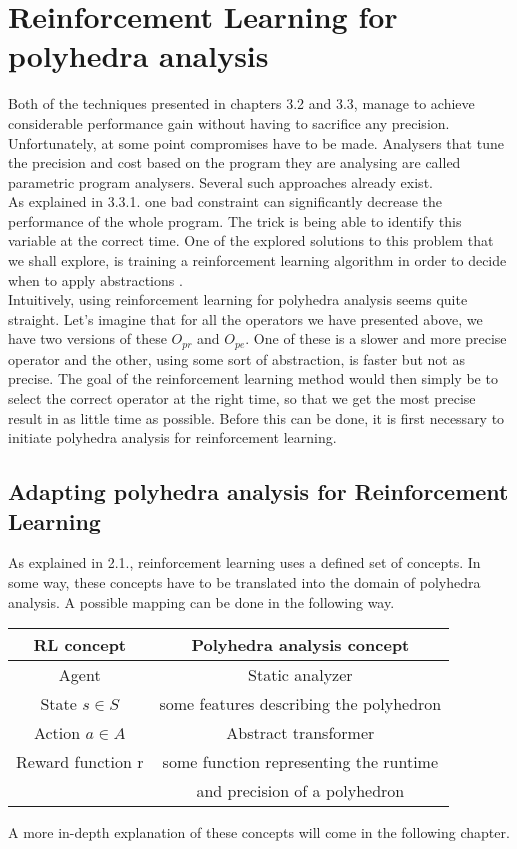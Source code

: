 \section{Reinforcement Learning for polyhedra analysis}
Both of the techniques presented in chapters 3.2 and 3.3, manage to achieve considerable performance gain without having to sacrifice any precision. Unfortunately, at some point compromises have to be made. Analysers that tune the precision and cost based on the program they are analysing are called parametric program analysers. Several such approaches already exist. \cite{oh2015learning,liang2011learning,heo2016learning} \\
As explained in 3.3.1. one bad constraint can significantly decrease the performance of the whole program. The trick is being able to identify this variable at the correct time. One of the explored solutions to this problem that we shall explore, is training a reinforcement learning algorithm  in order to decide when to apply abstractions \cite{singh2018fast}.\\
Intuitively, using reinforcement learning for polyhedra analysis seems quite straight. Let's imagine that for all the operators we have presented above, we have two versions of these $O_{pr}$ and $O_{pe}$. One of these is a slower and more precise operator and the other, using some sort of abstraction, is faster but not as precise. The goal of the reinforcement learning method would then simply be to select the correct operator at the right time, so that we get the most precise result in as little time as possible. Before this can be done, it is first necessary to initiate polyhedra analysis for reinforcement learning.

\subsection{Adapting polyhedra analysis for Reinforcement Learning}
As explained in 2.1., reinforcement learning uses a defined set of concepts. In some way, these concepts have to be translated into the domain of polyhedra analysis. A possible mapping can be done in the following way.
\begin{center}
\begin{tabular}{||c c||} 
 \hline
 RL concept & Polyhedra analysis concept  \\ [0.5ex] 
 \hline
 \hline
 Agent & Static analyzer\\ 

 State $s\in S$ & some features describing the polyhedron\\

 Action $a \in A$ & Abstract transformer \\
 
 Reward function r & some function representing the runtime\\
 
  & and precision of a polyhedron\\
 \hline
\end{tabular}
\end{center}
A more in-depth explanation of these concepts will come in the following chapter.

